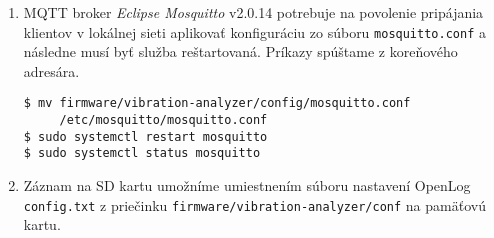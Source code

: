 \begin{enumerate}
\item{MQTT broker \emph{Eclipse Mosquitto} v2.0.14 potrebuje na povolenie pripájania klientov v lokálnej sieti
aplikovať konfiguráciu zo súboru \verb|mosquitto.conf| a následne musí byť služba reštartovaná.
Príkazy spúštame z koreňového adresára.
\begin{lstlisting}[style=messages]
$ mv firmware/vibration-analyzer/config/mosquitto.conf 
     /etc/mosquitto/mosquitto.conf 
$ sudo systemctl restart mosquitto
$ sudo systemctl status mosquitto
\end{lstlisting}}

\item {Záznam na SD kartu umožníme umiestnením súboru nastavení OpenLog \verb|config.txt| 
z priečinku \verb|firmware/vibration-analyzer/conf| na pamäťovú kartu.}
\end{enumerate}


